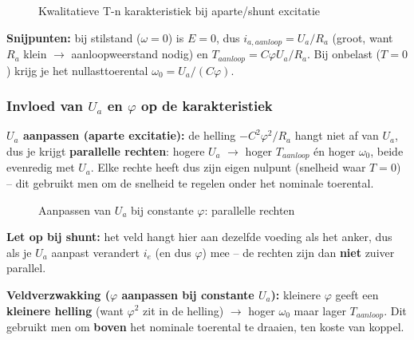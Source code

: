 \begin{figure}[H]
\centering
{}
\caption{Kwalitatieve T-n karakteristiek bij aparte/shunt excitatie}
\end{figure}

\textbf{Snijpunten:} bij stilstand ($\omega=0$) is $E=0$, dus $i_{a,aanloop}=U_a/R_a$
(groot, want $R_a$ klein $\to$ aanloopweerstand nodig) en
$T_{aanloop} = C\varphi U_a/R_a$.
Bij onbelast ($T=0$) krijg je het nullasttoerental $\omega_0 = U_a/(C\varphi)$.

\subsubsection{Invloed van $U_a$ en $\varphi$ op de karakteristiek}
\textbf{$U_a$ aanpassen (aparte excitatie):} de helling $-C^2\varphi^2/R_a$ hangt niet af
van $U_a$, dus je krijgt \textbf{parallelle rechten}:
hogere $U_a$ $\to$ hoger $T_{aanloop}$ én hoger $\omega_0$, beide evenredig met $U_a$.
Elke rechte heeft dus zijn eigen nulpunt (snelheid waar $T=0$) -- dit gebruikt men om de
snelheid te regelen onder het nominale toerental.

\begin{figure}[H]
\centering
{}
\caption{Aanpassen van $U_a$ bij constante $\varphi$: parallelle rechten}
\end{figure}

\textbf{Let op bij shunt:} het veld hangt hier aan dezelfde voeding als het anker, dus als
je $U_a$ aanpast verandert $i_e$ (en dus $\varphi$) mee -- de rechten zijn dan
\textbf{niet} zuiver parallel.

\textbf{Veldverzwakking ($\varphi$ aanpassen bij constante $U_a$):} kleinere $\varphi$
geeft een \textbf{kleinere helling} (want $\varphi^2$ zit in de helling) $\to$ hoger
$\omega_0$ maar lager $T_{aanloop}$.
Dit gebruikt men om \textbf{boven} het nominale toerental te draaien, ten koste van
koppel.

